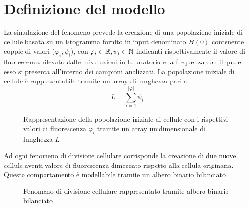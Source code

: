 \section{Definizione del modello}

La simulazione del fenomeno prevede la creazione di una popolazione iniziale
di cellule basata su un istogramma fornito in input denominato $H(0)$
contenente coppie di valori ($\varphi_{i}, \psi_{i}$),
con $\varphi_{i} \in \mathbb{R}, \psi_{i} \in \mathbb{N}$ indicanti rispettivamente il
valore di fluorescenza rilevato dalle misurazioni in laboratorio e
la frequenza con il quale esso si presenta all'interno dei campioni analizzati.
La popolazione iniziale di cellule è rappresentabile tramite un array di
lunghezza pari a $$L = \sum_{i=1}^{|\varphi|} \psi_{i}$$

\begin{figure}[H]
\centering
{}
\caption{Rappresentazione della popolazione iniziale di cellule con i rispettivi
    valori di fluorescenza $\varphi_{i}$ tramite un array unidimensionale
    di lunghezza $L$}
\end{figure}

Ad ogni fenomeno di divisione cellulare corrisponde
la creazione di due nuove cellule aventi valore di fluorescenza dimezzato
rispetto alla cellula originaria.
Questo comportamento è modellabile tramite un albero binario bilanciato

\begin{figure}[H]
\centering
{}
\caption{Fenomeno di divisione cellulare rappresentato tramite albero
    binario bilanciato}
\end{figure}

